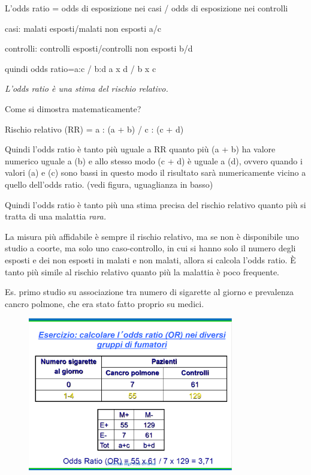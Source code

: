 L'odds ratio = odds di esposizione nei casi / odds di esposizione nei
controlli

casi: malati esposti/malati non esposti a/c

controlli: controlli esposti/controlli non esposti b/d

quindi odds ratio=a:c / b:d a x d / b x c

\emph{L'odds ratio è una stima del rischio relativo.}

Come si dimostra matematicamente?

Rischio relativo (RR) = a : (a + b) / c : (c + d)

Quindi l'odds ratio è tanto più uguale a RR quanto più (a + b) ha valore
numerico uguale a (b) e allo stesso modo (c + d) è uguale a (d), ovvero
quando i valori (a) e (c) sono bassi in questo modo il risultato sarà
numericamente vicino a quello dell'odds ratio. (vedi figura, uguaglianza
in basso)

Quindi l'odds ratio è tanto più una stima precisa del rischio relativo
quanto più si tratta di una malattia \emph{rara.}

La misura più affidabile è sempre il rischio relativo, ma se non è
disponibile uno studio a coorte, ma solo uno caso-controllo, in cui si
hanno solo il numero degli esposti e dei non esposti in malati e non
malati, allora si calcola l'odds ratio. È tanto più simile al rischio
relativo quanto più la malattia è poco frequente.

Es. primo studio su associazione tra numero di sigarette al giorno e
prevalenza cancro polmone, che era stato fatto proprio su medici.

\begin{figure}[!ht]
\centering
	\includegraphics[width=0.8\textwidth]{04/image7.png}
	\end{figure}

